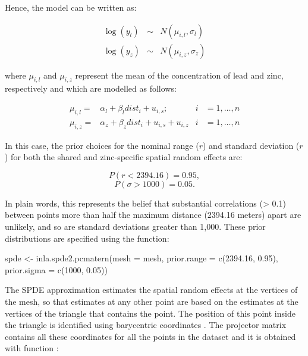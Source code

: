 Hence, the model can be written as: 

$$
\begin{array}{rcl}
\log(y_{l}) &\sim& N(\mu_{i,l}, \sigma_l)\nonumber\\
\log(y_{z}) &\sim& N(\mu_{i,z}, \sigma_z)\nonumber
\end{array}
$$

\noindent
where $\mu_{i,l}$ and $\mu_{i,z}$ represent the mean of the concentration of lead and zinc, respectively and which are modelled as follows:


\begin{align}
\mu_{i,l} =& \alpha_l + \beta_l dist_i + u_{i,s};  &i&=1,\ldots,n\nonumber\\
\mu_{i,z} =& \alpha_z + \beta_z dist_i + u_{i,s} + u_{i,z}  &i&=1,\ldots,n\nonumber
\end{align}


\medskip
In this case, the prior choices for the nominal range ($r$) and standard deviation ($r$) for both the shared and zinc-specific spatial random effects are: 

$$ P(r < 2394.16) = 0.95,  $$
$$ P(\sigma > 1000) = 0.05 .$$

\noindent
In plain words, this represents the belief that substantial correlations (> 0.1) between points more than half the maximum distance (2394.16 meters) apart are unlikely, and so are standard deviations greater than 1,000. These prior distributions are specified using the  function:

\begin{example*}
spde <- inla.spde2.pcmatern(mesh = mesh,
  prior.range = c(2394.16, 0.95), prior.sigma = c(1000, 0.05)) 
\end{example*}


The SPDE approximation estimates the spatial random effects at the vertices
of the mesh, so that estimates at any other point are based on the estimates at the vertices of the triangle that contains the point. The position of this point inside the triangle is identified
using barycentric coordinates \citep[see][for details]{Krainskietal:2019}.
The projector matrix contains all these coordinates for all the points in the
dataset and it is obtained with function :

